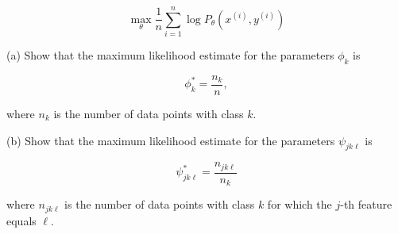 \documentclass[10pt]{article}
\begin{document}
$$
\max _{\theta} \frac{1}{n} \sum_{i=1}^{n} \log P_{\theta}\left(x^{(i)}, y^{(i)}\right)
$$

(a) Show that the maximum likelihood estimate for the parameters $\phi_{k}$ is

$$
\phi_{k}^{*}=\frac{n_{k}}{n},
$$

where $n_{k}$ is the number of data points with class $k$.

(b) Show that the maximum likelihood estimate for the parameters $\psi_{j k \ell}$ is

$$
\psi_{j k \ell}^{*}=\frac{n_{j k \ell}}{n_{k}}
$$

where $n_{j k \ell}$ is the number of data points with class $k$ for which the $j$-th feature equals $\ell$.
\end{document}

